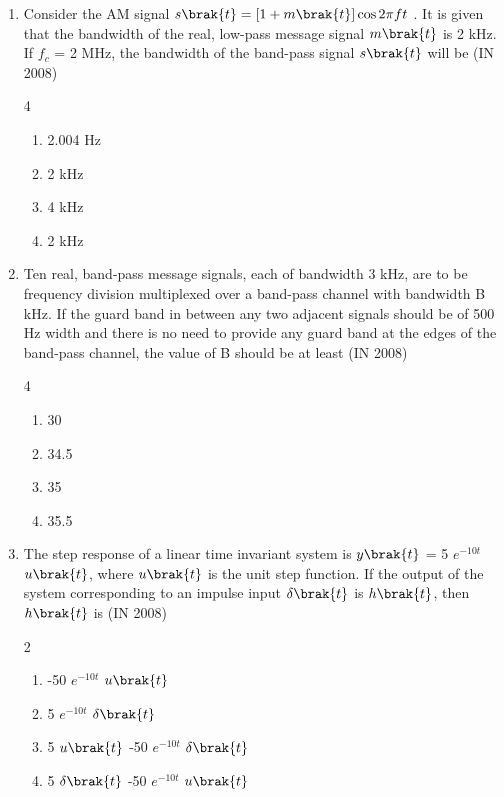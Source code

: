 \begin{enumerate}[label=\thesubsection.\arabic*,ref=\thesubsection.\theenumi]
   \item Consider the AM signal $s\brak{t} = [1+ m\brak{t}]\cos{2{\pi}ft}$ . It is given that the bandwidth of the real, low-pass message signal $m\brak{t}$ is 2 kHz. If $f_{c}$ = 2 MHz, the bandwidth of the band-pass signal $s\brak{t}$ will be \hfill{(IN 2008)}
\begin{multicols}{4}
    \begin{enumerate} 
            \item  2.004 Hz
            \item  2 kHz
            \item  4 kHz
            \item  2 kHz
     \end{enumerate}
     \end{multicols}

         \item Ten real, band-pass message signals, each of bandwidth 3 kHz, are to be frequency division multiplexed over a band-pass channel with bandwidth B kHz. If the guard band in between any two adjacent signals should be of 500 Hz width and there is no need to provide any guard band at the edges of the band-pass channel, the value of B should be at least \hfill{(IN 2008)}
\begin{multicols}{4}
          \begin{enumerate} 
              \item  30
              \item  34.5
              \item  35
              \item  35.5
           \end{enumerate}
           \end{multicols}

\item The step response of a linear time invariant system is $y\brak{t}$ = 5 $e^{-10t}$ $u\brak{t}$, where $u\brak{t}$  is the unit step
function. If the output of the system corresponding to an impulse input $\delta\brak{t}$ is $h\brak{t}$, then $h\brak{t}$ is \hfill{(IN 2008)}
\begin{multicols}{2}
          \begin{enumerate} 
                \item -50 $e^{-10t}$ $u\brak{t}$
                \item 5 $e^{-10t}$ $\delta\brak{t}$
                \item 5 $u\brak{t}$ -50 $e^{-10t}$ $\delta\brak{t}$
                \item 5 $\delta\brak{t}$ -50 $e^{-10t}$ $u\brak{t}$
                

\end{enumerate}
\end{multicols}
\end{enumerate}
